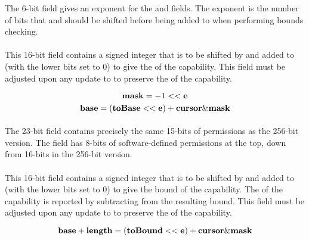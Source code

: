 The 6-bit \cexponent{} field gives an exponent for the \ctobase{} and \ctobound{} fields.
The exponent is the number of bits that \ctobase{} and \ctobound{} should be shifted before being added to \ccursor{} when performing bounds checking.

\paragraph{\ctobase{}}

This 16-bit field contains a signed integer that is to be shifted by \cexponent{} and added to \ccursor{} (with the lower bits set to 0) to give the \cbase{} of the capability.
This field must be adjusted upon any update to \ccursor{} to preserve the \cbase{} of the capability.

\newcommand{\mask}{{\bf mask}}
\begin{equation*}
\mask{} = -1 << \cexponent{}
\end{equation*}
\begin{equation*}
\cbase{} = (\ctobase{} << \cexponent{}) + \ccursor{} \& \mask{}
\end{equation*}

\paragraph{\cperms}

The 23-bit \cperms{} field contains precisely the same 15-bits of permissions as the 256-bit version.  The \cperms{} field has 8-bits of software-defined permissions at the top, down from 16-bits in the 256-bit version.

\paragraph{\ctobound{}}

This 16-bit field contains a signed integer that is to be shifted by \cexponent{} and added to \ccursor{} (with the lower bits set to 0) to give the bound of the capability.
The \clength{} of the capability is reported by subtracting \cbase{} from the resulting bound.
This field must be adjusted upon any update to \ccursor{} to preserve the \clength{} of the capability.

\begin{equation*}
\cbase{} + \clength{} = (\ctobound{} << \cexponent{}) + \ccursor{} \& \mask{}
\end{equation*}

\paragraph{\cotype{}}

